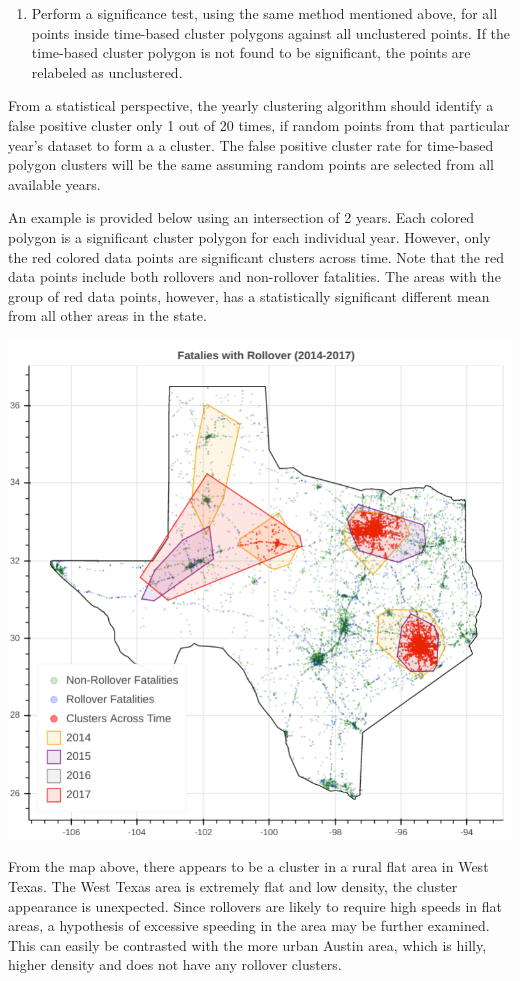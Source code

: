 \documentclass{article}
\begin{document}
\begin{enumerate}
	\item Perform a significance test, using the same method mentioned above, for all points inside time-based cluster polygons against all unclustered points. If the time-based cluster polygon is not found to be significant, the points are relabeled as unclustered.
\end{enumerate}
From a statistical perspective, the yearly clustering algorithm should identify a false positive cluster only 1 out of 20 times, if random points from that particular year's dataset to form a a cluster. The false positive cluster rate for time-based polygon clusters will be the same assuming random points are selected from all available years.

An example is provided below using an intersection of 2 years. Each colored polygon is a significant cluster polygon for each individual year. However, only the red colored data points are significant clusters across time. Note that the red data points include both rollovers and non-rollover fatalities. The areas with the group of red data points, however, has a statistically significant different mean from all other areas in the state.
\begin{center}
\includegraphics[scale=0.4]{technical.png}
\end{center}
From the map above, there appears to be a cluster in a rural flat area in West Texas. The West Texas area is extremely flat and low density, the cluster appearance is unexpected. Since rollovers are likely to require high speeds in flat areas, a hypothesis of excessive speeding in the area may be further examined. This can easily be contrasted with the more urban Austin area, which is hilly, higher density and does not have any rollover clusters.



\end{document}
